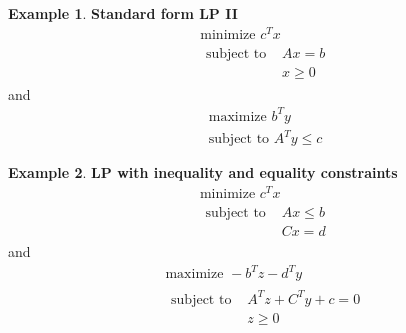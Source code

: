 \documentclass[10pt]{article}
\theoremstyle{definition}
\newtheorem{example}{Example}[section]
\begin{document}
\begin{example} \textbf{Standard form LP II}
	\begin{equation*}
		\begin{split}
			&\text{minimize } c^Tx\\
			&\begin{split}
				\text{subject to } &Ax = b \\
				& x \ge 0
			\end{split}
		\end{split}
	\end{equation*}
	and 
	\begin{equation*}
		\begin{split}
			&\text{maximize } b^Ty\\
			& \text{subject to } A^Ty \le c
		\end{split}
	\end{equation*}
\end{example}


\begin{example} \textbf{LP with inequality and equality constraints}
	\begin{equation*}
		\begin{split}
			&\text{minimize } c^Tx\\
			&\begin{split}
				\text{subject to } &Ax \le b \\
				& Cx = d
			\end{split}
		\end{split}
	\end{equation*}
	and 
	\begin{equation*}
		\begin{split}
			&\text{maximize } -b^Tz - d^Ty\\
			&\begin{split}
				\text{subject to } &A^Tz + C^Ty + c = 0\\
				& z \ge 0
			\end{split}
		\end{split}
	\end{equation*}
\end{example}
\end{document}

